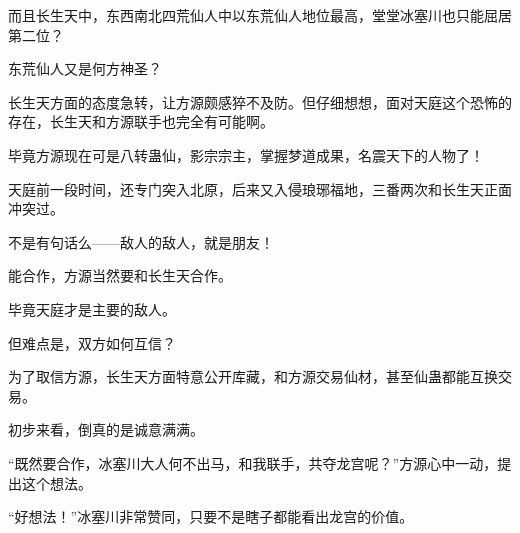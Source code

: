 \begin{this_body}
而且长生天中，东西南北四荒仙人中以东荒仙人地位最高，堂堂冰塞川也只能屈居第二位？

东荒仙人又是何方神圣？

长生天方面的态度急转，让方源颇感猝不及防。但仔细想想，面对天庭这个恐怖的存在，长生天和方源联手也完全有可能啊。

毕竟方源现在可是八转蛊仙，影宗宗主，掌握梦道成果，名震天下的人物了！

天庭前一段时间，还专门突入北原，后来又入侵琅琊福地，三番两次和长生天正面冲突过。

不是有句话么——敌人的敌人，就是朋友！

能合作，方源当然要和长生天合作。

毕竟天庭才是主要的敌人。

但难点是，双方如何互信？

为了取信方源，长生天方面特意公开库藏，和方源交易仙材，甚至仙蛊都能互换交易。

初步来看，倒真的是诚意满满。

“既然要合作，冰塞川大人何不出马，和我联手，共夺龙宫呢？”方源心中一动，提出这个想法。

“好想法！”冰塞川非常赞同，只要不是瞎子都能看出龙宫的价值。

\end{this_body}

